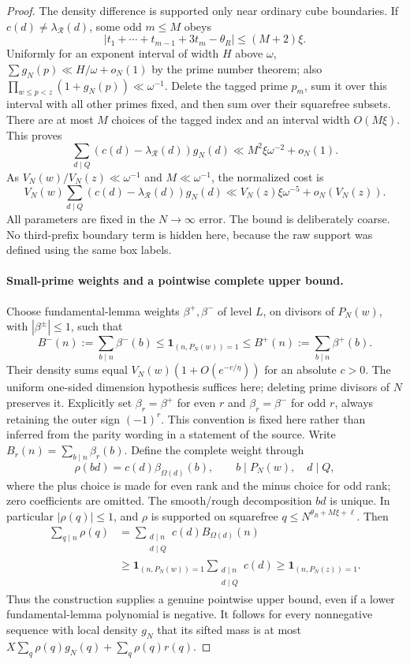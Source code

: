 \documentclass[11pt]{article}
\begin{document}
\begin{proof}
The density difference is supported only near ordinary cube boundaries.
If $c(d)\ne\lambda_{\mathcal R}(d)$, some odd $m\le M$ obeys
\[
 \left|t_1+\cdots+t_{m-1}+3t_m-\theta_R\right|
                         \le(M+2)\xi.
\]
Uniformly for an exponent interval of width $H$ above $\omega$,
$\sum g_N(p)\ll H/\omega+o_N(1)$ by the prime number theorem;
also $\prod_{w\le p<z}(1+g_N(p))\ll\omega^{-1}$.
Delete the tagged prime $p_m$, sum it over this interval with all
other primes fixed, and then sum over their squarefree subsets.
There are at most $M$ choices of the tagged index and an interval
width $O(M\xi)$. This proves
\[
 \sum_{d\mid Q}(c(d)-\lambda_{\mathcal R}(d))g_N(d)
 \ll M^2\xi\omega^{-2}+o_N(1).
\]
As $V_N(w)/V_N(z)\ll\omega^{-1}$ and $M\ll\omega^{-1}$,
the normalized cost is
\begin{equation}\label{eq:cube-box-density-error}
 V_N(w)\sum_{d\mid Q}(c(d)-\lambda_{\mathcal R}(d))g_N(d)
 \ll V_N(z)\xi\omega^{-5}+o_N(V_N(z)).
\end{equation}
All parameters are fixed in the $N\to\infty$ error. The bound is
deliberately coarse. No third-prefix boundary term is hidden here,
because the raw support was defined using the same box labels.

\paragraph{Small-prime weights and a pointwise complete upper bound.}
Choose fundamental-lemma weights $\beta^+,\beta^-$ of level $L$,
on divisors of $P_N(w)$, with $|\beta^\pm|\le1$, such that
\[
 B^-(n):=\sum_{b\mid n}\beta^-(b)
 \le\mathbf1_{(n,P_N(w))=1}\le
 B^+(n):=\sum_{b\mid n}\beta^+(b).
\]
Their density sums equal $V_N(w)(1+O(e^{-c/\eta}))$ for an absolute
$c>0$. The uniform one-sided dimension hypothesis suffices here;
deleting prime divisors of $N$ preserves it.
Explicitly set $\beta_r=\beta^+$ for even $r$ and
$\beta_r=\beta^-$ for odd $r$, always retaining the outer sign
$(-1)^r$. This convention is fixed here rather than inferred from
the parity wording in a statement of the source.
Write $B_r(n)=\sum_{b\mid n}\beta_r(b)$. Define the complete weight through
\[
 \rho(bd)=c(d)\beta_{\Omega(d)}(b),
 \qquad b\mid P_N(w),\quad d\mid Q,
\]
where the plus choice is made for even rank and the minus choice
for odd rank; zero coefficients are omitted. The smooth/rough
decomposition $bd$ is unique. In particular $|\rho(q)|\le1$, and
$\rho$ is supported on squarefree
$q\le N^{\theta_R+M\xi+\ell}$. Then
\begin{align*}
 \sum_{q\mid n}\rho(q)
 &=\sum_{\substack{d\mid n\\d\mid Q}}c(d)B_{\Omega(d)}(n)\\
 &\ge\mathbf1_{(n,P_N(w))=1}\sum_{\substack{d\mid n\\d\mid Q}}c(d)
 \ge\mathbf1_{(n,P_N(z))=1}.
\end{align*}
Thus the construction supplies a genuine pointwise upper bound,
even if a lower fundamental-lemma polynomial is negative.
It follows for every nonnegative sequence with local density $g_N$
that its sifted mass is at most
$X\sum_q\rho(q)g_N(q)+\sum_q\rho(q)r(q)$.


\end{proof}
\end{document}
